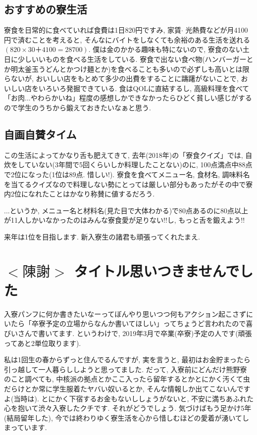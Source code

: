 \documentclass[10pt,b5jsbook,dvips,dvipdfmx,openany]{jsbook}
\theoremstyle{definition}
\begin{document}
		\subsection{おすすめの寮生活}
		寮食を日常的に食べていれば食費は1日820円ですみ, 家賃$ \cdot $ 光熱費などが月4100円で済むことを考えると, そんなにバイトをしなくても余裕のある生活を送れる$(820×30＋4100=28700)$. 僕は金のかかる趣味も特にないので, 寮食のない土日に少しいいものを食べる生活をしている. 寮食で出ない食べ物(ハンバーガーとか明太釜玉うどんとかつけ麺とか)を食べることも多いので必ずしも高いとは限らないが, おいしい店をもとめて多少の出費をすることに躊躇がないことで, おいしい店をいろいろ発掘できている. 食はQOLに直結するし, 高級料理を食べて「お肉...やわらかいね」程度の感想しかできなかったらひどく貧しい感じがするので学生のうちから鍛えておきたいなぁと思う. 

		\subsection{自画自賛タイム}
		この生活によってかなり舌も肥えてきて, 去年(2018年)の「寮食クイズ」では, 自炊をしていない(3年間で5回くらいしか料理したことない)のに, 100点満点中88点で2位になった(1位は89点. 惜しい!). 寮食を食べてメニュー名, 食材名, 調味料名を当てるクイズなので料理しない勢にとっては厳しい部分もあったがその中で寮内2位になれたことはかなり称賛に値するだろう. 

		...というか, メニュー名と材料名(見た目で大体わかる)で80点あるのに80点以上が11人しかいなかったのはみんな寮食愛が足りない!!し, もっと舌を鍛えよう!!

		来年は1位を目指します. 新入寮生の諸君も頑張ってくれたまえ. 



	\section{$<陳謝>$ タイトル思いつきませんでした} %
	入寮パンフに何か書きたいなーってぼんやり思いつつ何もアクション起こさずにいたら「卒寮予定の立場からなんか書いてほしい」ってちょうど言われたので喜びいさんで書いてます. というわけで, 2019年3月で卒業(卒寮)予定の人です(頑張ってあと2単位取ります). 
	
	私は1回生の春からずっと住んでるんですが, 実を言うと, 最初はお金貯まったら引っ越して一人暮らししようと思ってました. だって, 入寮前にどんだけ熊野寮のこと調べても, 中核派の拠点とかここ入ったら留年するとかとにかく汚くて虫だらけとか常に学生服着たヤバい奴いるとか, そんな情報しか出てこないんですよ(当時は). とにかく下宿するお金もないししょうがないと, 不安に満ちあふれた心を抱いて渋々入寮したクチです. それがどうでしょう. 気づけばもう足かけ5年(結局留年した), 今では終わりゆく寮生活を心から惜しむほどの愛着が湧いてしまっています. 
	
\end{document}

